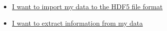\begin{tcolorbox}[title=What are you looking for?]
    \begin{itemize}
        \item \hyperref[sec:load_data]{I want to import my data to the HDF5 file format}
        \item \hyperref[sec:treatment]{I want to extract information from my data }
    \end{itemize}
\end{tcolorbox}
